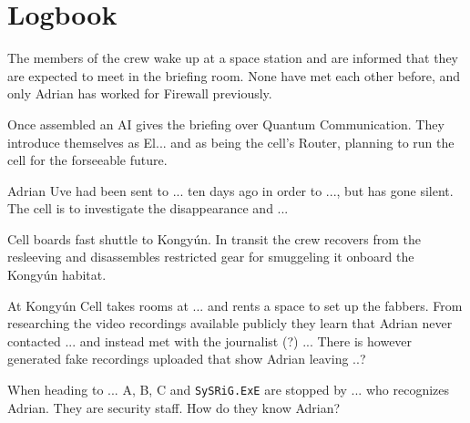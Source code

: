 
\chapter{Logbook}


The members of the crew wake up at a space station and are informed that they are expected to meet in the briefing room. None have met each other before, and only Adrian has worked for Firewall previously.

Once assembled an AI gives the briefing over Quantum Communication. They introduce themselves as El... and as being the cell's Router, planning to run the cell for the forseeable future.

Adrian Uve had been sent to ... ten days ago in order to ..., but has gone silent. The cell is to investigate the disappearance and ...

Cell boards fast shuttle to Kongyún. In transit the crew recovers from the resleeving and disassembles restricted gear for smuggeling it onboard the Kongyún habitat.

At Kongyún Cell takes rooms at ... and rents a space to set up the fabbers. From researching the video recordings available publicly they learn that Adrian never contacted ... and instead met with the journalist (?) ... There is however generated fake recordings uploaded that show Adrian leaving ..?

When heading to ... A, B, C and \texttt{SySRiG.ExE} are stopped by ... who recognizes Adrian. They are security staff. How do they know Adrian?
